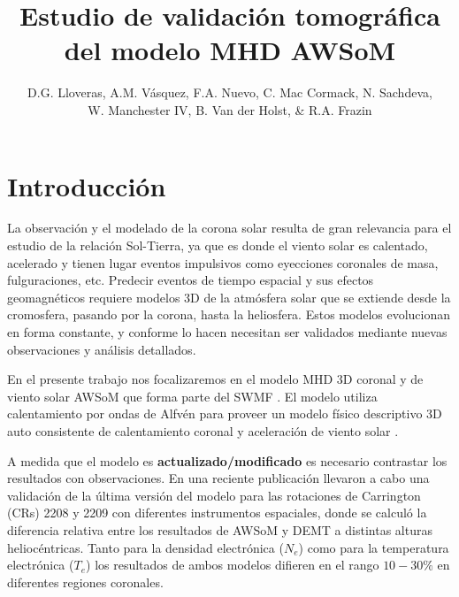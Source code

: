 \documentclass[baaa]{baaa}
\title{Estudio de validación tomográfica del modelo MHD AWSoM}
\author{D.G. Lloveras\inst{1}, A.M. Vásquez\inst{1}, F.A. Nuevo\inst{1}, C. Mac Cormack\inst{1}, N. Sachdeva\inst{2},\\ W. Manchester IV\inst{2}, B. Van der Holst\inst{2}, \& R.A. Frazin\inst{2}}
\institute{
Insituto de Astronomía y Física del Espacio, CONICET--UBA, Argentina \and
Climate and Space Sciences and Engineering, Universidad de Michigan, EEUU.
}
\begin{document}
\maketitle

\section{Introducción}
\label{S_intro}
La observación y el modelado de la corona solar resulta de gran relevancia para el estudio de la relación Sol-Tierra, ya que es donde el viento solar es calentado, acelerado y tienen lugar eventos impulsivos como eyecciones coronales de masa, fulguraciones, etc. Predecir eventos de tiempo espacial y sus efectos geomagnéticos requiere modelos 3D de la atmósfera solar que se extiende desde la cromosfera, pasando por la corona, hasta la heliosfera. Estos modelos evolucionan en forma constante, y conforme lo hacen necesitan ser validados mediante nuevas observaciones y análisis detallados.

En el presente trabajo nos focalizaremos en el modelo MHD 3D coronal y de viento solar AWSoM que forma parte del SWMF \citet{Toth_2012}. El modelo utiliza calentamiento por ondas de Alfvén para proveer un modelo físico descriptivo 3D auto consistente de calentamiento coronal y aceleración de viento solar \citep{sokolov_2013}  \citep{vander_2014}.

A medida que el modelo es \textbf{actualizado/modificado} es necesario contrastar los resultados con observaciones. En una reciente publicación \citet{sachdeva_2019} llevaron a cabo una validación de la última versión del modelo para las rotaciones de Carrington (CRs) 2208 y 2209 con diferentes instrumentos espaciales, donde se calculó la diferencia relativa entre los resultados de AWSoM y DEMT a distintas alturas heliocéntricas. Tanto para la densidad electrónica ($N_e$) como para la temperatura electrónica ($T_e$) los resultados de ambos modelos difieren en el rango $10-30\%$ en diferentes regiones coronales.

\end{document}

